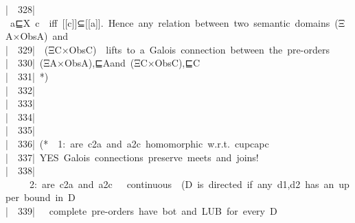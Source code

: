 \documentclass{article}
\newcommand{\syntaxCOMMENTA}[1]{\textcolor[rgb]{0.8,0.0,0.0}{#1}}
\newcommand{\syntaxCOMMENTA}[1]{\textcolor[rgb]{0.8,0.0,0.0}{#1}}
\newcommand{\syntaxCOMMENTA}[1]{\textcolor[rgb]{0.8,0.0,0.0}{#1}}
\newcommand{\syntaxCOMMENTA}[1]{\textcolor[rgb]{0.8,0.0,0.0}{\textbf{#1}}}
\newcommand{\syntaxCOMMENTA}[1]{\textcolor[rgb]{0.8,0.0,0.0}{#1}}
\newcommand{\syntaxCOMMENTA}[1]{\textcolor[rgb]{0.8,0.0,0.0}{#1}}
\newcommand{\syntaxCOMMENTA}[1]{\textcolor[rgb]{0.0,0.0,0.0}{#1}}
\newcommand{\gutter}[1]{\textcolor[rgb]{0,0,0}{{|}#1}}
\newcommand{\gutterH}[1]{\textcolor[rgb]{1,0,0}{{|}#1}}
\begin{document}
\gutter{\ \ 328{|}\ }\syntaxCOMMENTA{a⊑\usebox{\underscorebox}X{\ }c{\ }{\ }iff{\ }{[}{[}c{]}{]}⊆{[}{[}a{]}{]}.{\ }Hence{\ }any{\ }relation{\ }between{\ }two{\ }semantic{\ }domains{\ }(Ξ\usebox{\underscorebox}A×Obs\usebox{\underscorebox}A){\ }and}\hspace*{\fill}\\
\gutter{\ \ 329{|}\ }\syntaxCOMMENTA{{\ }(Ξ\usebox{\underscorebox}C×Obs\usebox{\underscorebox}C){\ }{\ }lifts{\ }to{\ }a{\ }Galois{\ }connection{\ }between{\ }the{\ }pre{-}orders}\hspace*{\fill}\\
\gutterH{\ \ 330{|}\ }\syntaxCOMMENTA{\usebox{\lessthan}(Ξ\usebox{\underscorebox}A×Obs\usebox{\underscorebox}A),⊑\usebox{\underscorebox}A\usebox{\greaterthan}{\ }and{\ }\usebox{\lessthan}(Ξ\usebox{\underscorebox}C×Obs\usebox{\underscorebox}C),⊑\usebox{\underscorebox}C\usebox{\greaterthan}}\hspace*{\fill}\\
\gutter{\ \ 331{|}\ }\syntaxCOMMENTA{*)}\hspace*{\fill}\\
\gutter{\ \ 332{|}\ }\hspace*{\fill}\\
\gutter{\ \ 333{|}\ }\hspace*{\fill}\\
\gutter{\ \ 334{|}\ }\hspace*{\fill}\\
\gutterH{\ \ 335{|}\ }\hspace*{\fill}\\
\gutter{\ \ 336{|}\ }\syntaxCOMMENTA{(*{\ }{\ }1:{\ }are{\ }c2a{\ }and{\ }a2c{\ }homomorphic{\ }w.r.t.{\ }cup\usebox{\underscorebox}{\ }cap\usebox{\underscorebox}{\ }{\ }\usebox{\underscorebox}\usebox{\hatbox}c{\ }}\hspace*{\fill}\\
\gutter{\ \ 337{|}\ }\syntaxCOMMENTA{YES{\ }Galois{\ }connections{\ }preserve{\ }meets{\ }and{\ }joins!}\hspace*{\fill}\\
\gutter{\ \ 338{|}\ }\syntaxCOMMENTA{{\ }{\ }{\ }{\ }2:{\ }are{\ }c2a{\ }and{\ }a2c{\ }{\ }{\ }continuous{\ }{\ }(D{\ }is{\ }directed{\ }if{\ }any{\ }d1,d2{\ }has{\ }an{\ }upper{\ }bound{\ }in{\ }D}\hspace*{\fill}\\
\gutter{\ \ 339{|}\ }\syntaxCOMMENTA{{\ }{\ }complete{\ }pre{-}orders{\ }have{\ }bot{\ }and{\ }LUB{\ }for{\ }every{\ }D}\hspace*{\fill}\\
\end{document}
